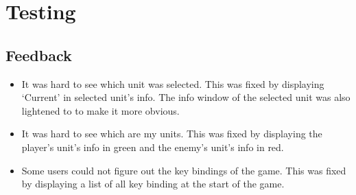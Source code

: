 \section{Testing}

\subsection{Feedback}
\begin{itemize}
	\item It was hard to see which unit was selected. This was fixed by  displaying `Current' in selected unit's info. The info window of the selected unit was also lightened to to make it more obvious.
	
	\item It was hard to see which are my units. This was fixed by displaying the player's unit's info in green and the enemy's unit's info in red. 
	
	\item Some users could not figure out the key bindings of the game. This was fixed by displaying a list of all key binding at the start of the game.
\end{itemize}